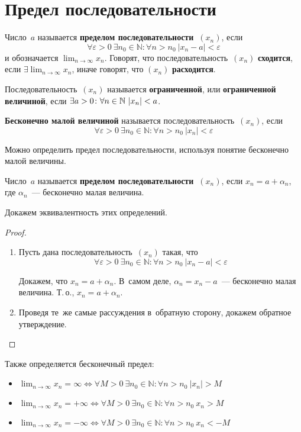\section{Предел последовательности}
  Число~$a$ называется \textbf{пределом последовательности~$(x_n)$}, если
\begin{equation*}
\forall \varepsilon > 0 \ \exists n_0 \in \mathbb N \colon \forall n > n_0 \ |x_n - a| < \varepsilon
\end{equation*}
и обозначается $\displaystyle \lim_{n \to \infty} x_n$.
Говорят, что последовательность~$(x_n)$ \textbf{сходится}, если $\displaystyle \exists\lim_{n \to \infty} x_n$, иначе говорят, что $(x_n)$ \textbf{расходится}.

Последовательность~$(x_n)$ называется \textbf{ограниченной}, или \textbf{ограниченной величиной}, если
$\exists a \opbr> 0 \colon \allowbreak \forall n \in \mathbb N \ |x_n| < a$.

 \textbf{Бесконечно малой величиной} называется последовательность~$(x_n)$, если
\begin{equation*}
\forall \varepsilon > 0 \ \exists n_0 \in \mathbb N \colon \forall n > n_0 \ |x_n| < \varepsilon
\end{equation*}

Можно определить предел последовательности, используя понятие бесконечно малой величины.

Число~$a$ называется \textbf{пределом последовательности~$(x_n)$}, если $x_n = a + \alpha_n$, где $\alpha_n$~--- бесконечно малая величина.

Докажем эквивалентность этих определений.
\begin{proof}
\begin{enumerate}
	\item Пусть дана последовательность~$(x_n)$ такая, что
	\begin{equation*}
	\forall \varepsilon > 0 \ \exists n_0 \in \mathbb N \colon \forall n > n_0 \ |x_n - a| < \varepsilon
	\end{equation*}
	
	Докажем, что $x_n = a + \alpha_n$.
	В~самом деле, $\alpha_n = x_n - a$~--- бесконечно малая величина.
	Т.\,о., $x_n = a + \alpha_n$.
	
	\item Проведя те~же самые рассуждения в~обратную сторону, докажем обратное утверждение.
\end{enumerate}
\end{proof}

Также определяется бесконечный предел:
\begin{itemize}
	\item $\displaystyle \lim_{n \to \infty} x_n = \infty \Leftrightarrow
	\forall M > 0 \ \exists n_0 \in \mathbb N \colon \forall n > n_0 \ |x_n| > M$
	\item $\displaystyle \lim_{n \to \infty} x_n = +\infty \Leftrightarrow
	\forall M > 0 \ \exists n_0 \in \mathbb N \colon \forall n > n_0 \ x_n > M$
	\item $\displaystyle \lim_{n \to \infty} x_n = -\infty \Leftrightarrow
	\forall M > 0 \ \exists n_0 \in \mathbb N \colon \forall n > n_0 \ x_n < -M$
\end{itemize}